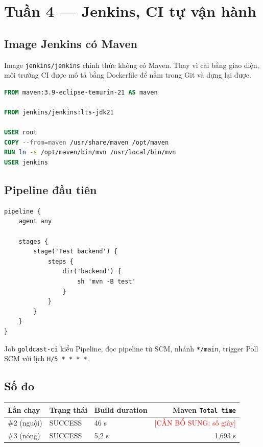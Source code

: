 \documentclass[12pt,a4paper]{article}
\newcommand{\canbosung}[1]{\textcolor{red}{[CẦN BỔ SUNG: #1]}}
\newcommand{\commit}[1]{\texttt{#1}}
\begin{document}
\section{Tuần 4 — Jenkins, CI tự vận hành}

\subsection{Image Jenkins có Maven}

Image \texttt{jenkins/jenkins} chính thức không có Maven. Thay vì cài bằng giao
diện, môi trường CI được mô tả bằng Dockerfile để nằm trong Git và dựng lại được.

\begin{lstlisting}[language=Dockerfile, caption={\texttt{jenkins/Dockerfile} ở tuần 4 (commit \commit{584d72a})}]
FROM maven:3.9-eclipse-temurin-21 AS maven

FROM jenkins/jenkins:lts-jdk21

USER root
COPY --from=maven /usr/share/maven /opt/maven
RUN ln -s /opt/maven/bin/mvn /usr/local/bin/mvn
USER jenkins
\end{lstlisting}

\subsection{Pipeline đầu tiên}

\begin{lstlisting}[language=Jenkinsfile, caption={\texttt{Jenkinsfile} ở tuần 4 (commit \commit{8ab21c5})}]
pipeline {
    agent any

    stages {
        stage('Test backend') {
            steps {
                dir('backend') {
                    sh 'mvn -B test'
                }
            }
        }
    }
}
\end{lstlisting}

Job \texttt{goldcast-ci} kiểu Pipeline, đọc pipeline từ SCM, nhánh
\texttt{*/main}, trigger Poll SCM với lịch \texttt{H/5 * * * *}.

\subsection{Số đo}

\begin{center}
\begin{tabular}{lllr}
\toprule
Lần chạy & Trạng thái & Build duration & Maven \texttt{Total time} \\
\midrule
\#2 (nguội) & SUCCESS & 46 s  & \canbosung{số giây} \\
\#3 (nóng)  & SUCCESS & 5,2 s & 1,693 s \\
\bottomrule
\end{tabular}
\end{center}
\end{document}
